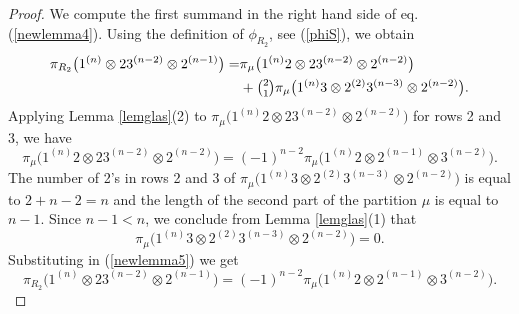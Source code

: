 \documentclass[11pt]{amsart}
\theoremstyle{definition}
\numberwithin{equation}{section}
\begin{document}
\begin{proof}
We compute the first summand in the right hand side of eq. (\ref{newlemma4}). Using the definition of $\phi_{R_2} $, see (\ref{phiS}),  we obtain 
\begin{align}\label{newlemma5}
	\pi_{R_2}\big(1^{(n)} \otimes 23^{(n-2)} \otimes 2^{(n-1)}\big)= &\pi_{\mu}\big(1^{(n)}2 \otimes 23^{(n-2)} \otimes 2^{(n-2)}\big) \\\nonumber&+\tbinom{2}{1}\pi_{\mu}\big(1^{(n)}3 \otimes 2^{(2)}3^{(n-3)} \otimes 2^{(n-2)}\big).
\end{align}
Applying Lemma \ref{lemglas}(2) to $\pi_{\mu}\big(1^{(n)}2 \otimes 23^{(n-2)} \otimes 2^{(n-2)}\big)$ for rows 2 and 3, we have \[ \pi_{\mu}\big(1^{(n)}2 \otimes 23^{(n-2)} \otimes 2^{(n-2)}\big) = (-1)^{n-2}\pi_{\mu}\big(1^{(n)}2 \otimes 2^{(n-1)} \otimes 3^{(n-2)}\big).\]
The number of 2's in rows 2 and 3 of $\pi_\mu\big(1^{(n)}3 \otimes 2^{(2)}3^{(n-3)} \otimes 2^{(n-2)}\big)$ is equal to $2+n-2=n$ and the length of the second part of the partition $\mu$ is equal to $n-1$. Since $n-1 < n$, we conclude from Lemma \ref{lemglas}(1) that \[\pi_\mu\big(1^{(n)}3 \otimes 2^{(2)}3^{(n-3)} \otimes 2^{(n-2)}\big)=0.\] Substituting in (\ref{newlemma5}) we get \begin{equation}\label{newlemma55}
	\pi_{R_2}\big(1^{(n)} \otimes 23^{(n-2)} \otimes 2^{(n-1)}\big)=(-1)^{n-2}\pi_{\mu}\big(1^{(n)}2 \otimes 2^{(n-1)} \otimes 3^{(n-2)}\big).
\end{equation}


\end{proof}
\end{document}
